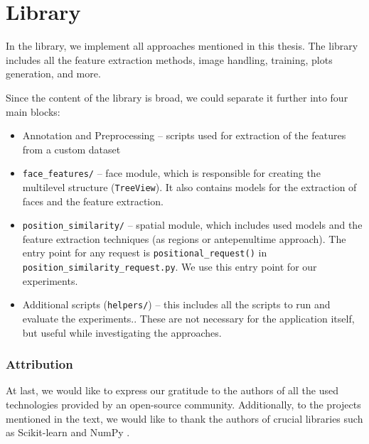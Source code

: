 \section{Library}

In the library, we implement all approaches mentioned in this thesis. The library includes all the feature extraction methods, image handling, training, plots generation, and more.

Since the content of the library is broad, we could separate it further into four main blocks: 
\begin{itemize}
    \item Annotation and Preprocessing -- scripts used for extraction of the features from a custom dataset
    \item \verb+face_features/+ -- face module, which is responsible for creating the multilevel structure (\verb+TreeView+). It also contains models for the extraction of faces and the feature extraction.
    \item \verb+position_similarity/+ -- spatial module, which includes used models and the feature extraction techniques (as regions or antepenultime approach). The entry point for any request is \verb+positional_request()+ in \verb+position_similarity_request.py+. We use this entry point for our experiments.
    \item Additional scripts (\verb+helpers/+) -- this includes all the scripts to run and evaluate the experiments.. These are not necessary for the application itself, but useful while investigating the approaches.
\end{itemize}

\subsubsection*{Attribution}

At last, we would like to express our gratitude to the authors of all the used technologies provided by an open-source community. Additionally, to the projects mentioned in the text, we would like to thank the authors of crucial libraries such as Scikit-learn \citep{pedregosa2011scikit} and NumPy \citep{van2011numpy}.

